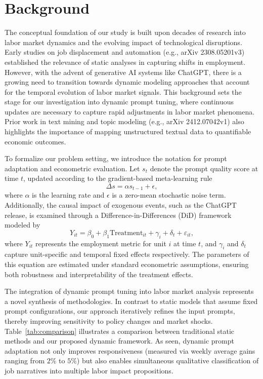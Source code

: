 \documentclass{article}
\begin{document}
\section{Background}
The conceptual foundation of our study is built upon decades of research into labor market dynamics and the evolving impact of technological disruptions. Early studies on job displacement and automation (e.g., arXiv 2308.05201v3) established the relevance of static analyses in capturing shifts in employment. However, with the advent of generative AI systems like ChatGPT, there is a growing need to transition towards dynamic modeling approaches that account for the temporal evolution of labor market signals. This background sets the stage for our investigation into dynamic prompt tuning, where continuous updates are necessary to capture rapid adjustments in labor market phenomena. Prior work in text mining and topic modeling (e.g., arXiv 2412.07042v1) also highlights the importance of mapping unstructured textual data to quantifiable economic outcomes.

To formalize our problem setting, we introduce the notation for prompt adaptation and econometric evaluation. Let \(s_t\) denote the prompt quality score at time \(t\), updated according to the gradient-based meta-learning rule 
\[
\Delta s = \alpha s_{t-1} + \epsilon,
\]
where \(\alpha\) is the learning rate and \(\epsilon\) is a zero-mean stochastic noise term. Additionally, the causal impact of exogenous events, such as the ChatGPT release, is examined through a Difference-in-Differences (DiD) framework modeled by
\[
Y_{it} = \beta_0 + \beta_1 \text{Treatment}_{it} + \gamma_i + \delta_t + \varepsilon_{it},
\]
where \(Y_{it}\) represents the employment metric for unit \(i\) at time \(t\), and \(\gamma_i\) and \(\delta_t\) capture unit-specific and temporal fixed effects respectively. The parameters of this equation are estimated under standard econometric assumptions, ensuring both robustness and interpretability of the treatment effects.

The integration of dynamic prompt tuning into labor market analysis represents a novel synthesis of methodologies. In contrast to static models that assume fixed prompt configurations, our approach iteratively refines the input prompts, thereby improving sensitivity to policy changes and market shocks. Table~\ref{tab:comparison} illustrates a comparison between traditional static methods and our proposed dynamic framework. As seen, dynamic prompt adaptation not only improves responsiveness (measured via weekly average gains ranging from \(2\%\) to \(5\%\)) but also enables simultaneous qualitative classification of job narratives into multiple labor impact propositions.
\end{document}
